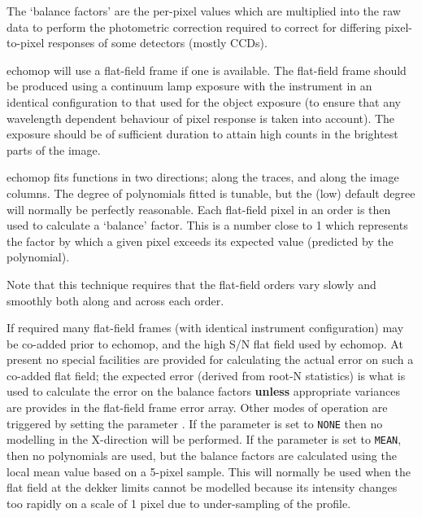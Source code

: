 
The `balance factors' are the per-pixel values which are multiplied into
the raw data to perform the photometric correction required to correct for
differing pixel-to-pixel responses of some detectors (mostly CCDs).

{\sc echomop} will use a flat-field frame if one is available. The flat-field
frame should  be produced using a continuum lamp exposure with the
instrument in an identical configuration to that used for the object
exposure (to ensure that any wavelength dependent behaviour of pixel
response is taken into account). The exposure should be of sufficient
duration to attain high counts in the brightest parts of the image.

{\sc echomop} fits functions in two directions; along the traces, and along the
image columns. The degree of polynomials fitted is tunable, but the
(low) default degree will normally be perfectly reasonable. Each flat-field
pixel in an order is then used to calculate a `balance' factor. This is a
number close to 1 which represents the factor by which a given pixel
exceeds its expected value (predicted by the polynomial).

Note that this technique requires that the flat-field orders vary slowly
and smoothly both along and across each order.

If required many flat-field frames (with identical instrument
configuration) may be co-added prior to {\sc echomop,} and the high S/N flat field
used by {\sc echomop.} At present no special facilities are provided for
calculating the actual error on such a co-added flat field; the expected
error (derived from root-N statistics) is what is used to calculate the
error on the balance factors {\bf unless} appropriate
variances are provides in the flat-field frame error array.
Other modes of operation are triggered by setting the parameter
\@.
If the parameter is set to \verb+NONE+ then no modelling in
the X-direction will be performed. If the parameter is set to \verb+MEAN+,
then no polynomials are  used, but the balance factors are calculated
using the local mean value based  on a 5-pixel sample. This will normally
be used when the flat field at the dekker limits cannot be modelled because
its intensity changes too rapidly on a scale of 1 pixel due to
under-sampling of the profile.

